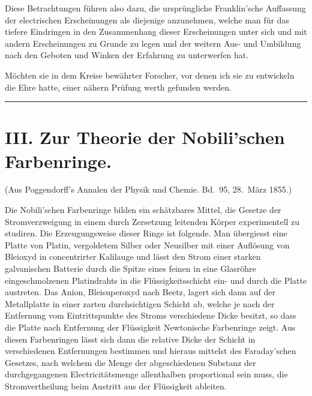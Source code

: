 \documentclass[12pt,a4paper]{book}
\theoremstyle{definition}
\theoremstyle{remark}
\begin{document}
Diese Betrachtungen führen also dazu, die ursprüngliche Franklin'sche Auffassung der electrischen Erscheinungen als diejenige anzunehmen, welche man für das tiefere Eindringen in den Zusammenhang dieser Erscheinungen unter sich und mit andern Erscheinungen zu Grunde zu legen und der weitern Aus- und Umbildung nach den Geboten und Winken der Erfahrung zu unterwerfen hat.

Möchten sie in dem Kreise bewährter Forscher, vor denen ich sie zu entwickeln die Ehre hatte, einer nähern Prüfung werth gefunden werden.

\vspace{2em}
\begin{center}
\rule{0.5\textwidth}{0.4pt}
\end{center}
\vspace{1em}


\section*{III. Zur Theorie der Nobili'schen Farbenringe.}

\begin{center}
\small
(Aus Poggendorff's Annalen der Physik und Chemie. Bd.~95, 28.~März 1855.)
\end{center}
\vspace{0.5em}

Die Nobili'schen Farbenringe bilden ein schätzbares Mittel, die Gesetze der Stromverzweigung in einem durch Zersetzung leitenden Körper experimentell zu studiren. Die Erzeugungsweise dieser Ringe ist folgende. Man übergiesst eine Platte von Platin, vergoldetem Silber oder Neusilber mit einer Auflösung von Bleioxyd in concentrirter Kalilauge und lässt den Strom einer starken galvanischen Batterie durch die Spitze eines feinen in eine Glasröhre eingeschmolzenen Platindrahts in die Flüssigkeitsschicht ein- und durch die Platte austreten. Das Anion, Bleisuperoxyd nach Beetz, lagert sich dann auf der Metallplatte in einer zarten durchsichtigen Schicht ab, welche je nach der Entfernung vom Eintrittspunkte des Stroms verschiedene Dicke besitzt, so dass die Platte nach Entfernung der Flüssigkeit Newtonische Farbenringe zeigt. Aus diesen Farbenringen lässt sich dann die relative Dicke der Schicht in verschiedenen Entfernungen bestimmen und hieraus mittelst des Faraday'schen Gesetzes, nach welchem die Menge der abgeschiedenen Substanz der durchgegangenen Electricitätsmenge allenthalben proportional sein muss, die Stromvertheilung beim Austritt aus der Flüssigkeit ableiten.
\end{document}
